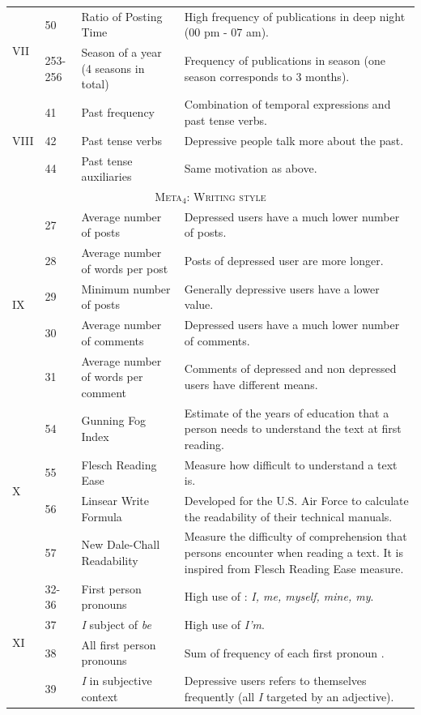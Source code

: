 \documentclass[graybox]{svmult}
\begin{document}
\begin{center}
\begin{footnotesize}
\begin{longtable}{@{} l@{\hspace{.2em}} l@{\hspace{.2em}} p{3.3cm} @{\hspace{.2em}} @{\hspace{.2em}} p{6cm}}
\hline
\multirow{2}{*}{VII}
& 50 & Ratio of Posting Time & High frequency of publications in deep night (00 pm - 07 am).\\
& 253-256 & Season of a year (4 seasons in total) & {Frequency of publications in season (one season corresponds to 3 months).}\\[3pt]
\hline
\multirow{3}{*}{VIII}
& 41 & Past frequency & Combination of temporal expressions and past tense verbs.\\
& 42 & Past tense verbs & Depressive people talk more about the past.\\
& 44 & Past tense auxiliaries & Same motivation as above.\\[3pt]
\hline
\multicolumn{4}{c}{\scshape{Meta$_{4}$}: Writing style}\\
\hline
\multirow{5}{*}{IX} 
& 27 & Average number of posts & Depressed users have a much lower number of posts.\\
& 28 & Average number of words per post & Posts of depressed user are more longer.\\
& 29 & Minimum number of posts & Generally depressive users have a lower value.\\
& 30 & Average number of comments & Depressed users have a much lower number of comments.\\
& 31 & Average number of words per comment & Comments of depressed and non depressed users have different means.\\[3pt]
\hline
\multirow{4}{*}{X}
& 54 & Gunning Fog Index & Estimate of the years of education that a person needs to understand the text at first reading.\\ 
& 55 & Flesch Reading Ease & Measure how difficult to understand a text is.\\
& 56 & Linsear Write Formula & Developed for the U.S. Air Force to calculate the readability of their technical manuals.\\
& 57 & New Dale-Chall Readability & Measure the difficulty of comprehension that persons encounter when reading a text. It is inspired from Flesch Reading Ease measure.\\[3pt]
\hline
\multirow{4}{*}{XI} 
& 32-36 & First person pronouns & High use of : \textit{I, me, myself, mine, my}.\\
& 37 &\textit{I} subject of \textit{be} & High use of \textit{I'm}.\\
& 38 & All first person pronouns & Sum of frequency of each first pronoun .\\
& 39 & \textit{I} in subjective context & Depressive users refers to themselves frequently (all \textit{I} targeted by an adjective).\\[3pt]

\end{longtable}
\end{footnotesize}
\end{center}
\end{document}
